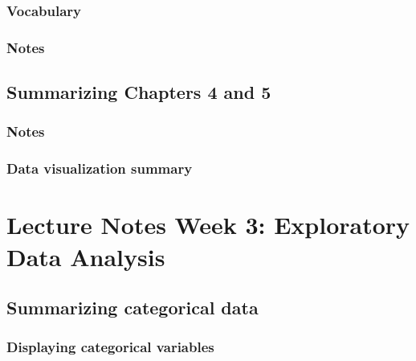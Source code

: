 \documentclass[
]{report}
\begin{document}
\hypertarget{vocabulary-4}{%
\subsubsection*{Vocabulary}\label{vocabulary-4}}

\hypertarget{notes-5}{%
\subsubsection*{Notes}\label{notes-5}}

\hypertarget{summarizing-chapters-4-and-5}{%
\subsection*{Summarizing Chapters 4 and 5}\label{summarizing-chapters-4-and-5}}

\hypertarget{notes-6}{%
\subsubsection*{Notes}\label{notes-6}}

\hypertarget{data-visualization-summary}{%
\subsubsection*{Data visualization summary}\label{data-visualization-summary}}

\hypertarget{lecture-notes-week-3-exploratory-data-analysis}{%
\section{Lecture Notes Week 3: Exploratory Data Analysis}\label{lecture-notes-week-3-exploratory-data-analysis}}

\hypertarget{summarizing-categorical-data}{%
\subsection*{Summarizing categorical data}\label{summarizing-categorical-data}}

\hypertarget{displaying-categorical-variables}{%
\subsubsection*{Displaying categorical variables}\label{displaying-categorical-variables}}
\end{document}
